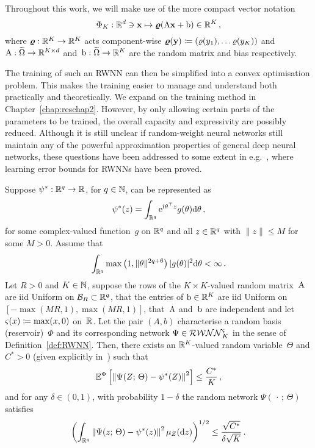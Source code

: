 \begin{remark}
Throughout this work, we will make use of the more compact vector notation
$$
\Phi_K: \mathbb{R}^d \ni \boldsymbol{\mathrm{x}}\mapsto \boldsymbol\varrho(\mathrm{A} \mathbf{x}+\mathrm{b}) \in \mathbb{R}^{K}\,,
$$
where $\boldsymbol\varrho:\mathbb{R}^K\rightarrow\mathbb{R}^K$ acts component-wise $\boldsymbol\varrho(\boldsymbol{\mathrm{y}})\coloneqq(\varrho(y_1), \dots \varrho(y_K))$ and~${\mathrm{A}: \widetilde{\Omega} \rightarrow \mathbb{R}^{K\times d}}$ and~${\mathrm{b}: \widetilde{\Omega} \rightarrow \mathbb{R}^K}$ are the random matrix and bias respectively.
\end{remark}

The training of such an RWNN can then be simplified into a convex optimisation problem. This makes the training easier to manage and understand both practically and theoretically. We expand on the training method in Chapter~\ref{chap:reschap2}. However, by only allowing certain parts of the parameters to be trained, the overall capacity and expressivity are possibly reduced. Although it is still unclear if random-weight neural networks still maintain any of the powerful approximation properties of general deep neural networks, these questions have been addressed to some extent in e.g.~\cite{Gonon2023ApproximationSystems, Mei2022GeneralizationConcentration}, where learning error bounds for RWNNs have been proved.

\begin{proposition}\label{prop:UATRWNN}
Suppose $\psi^{*}: \mathbb{R}^{q} \rightarrow \mathbb{R}$, for $q\in\mathbb{N}$, can be represented as
$$
\psi^{*}(z)=\int_{\mathbb{R}^{q}} \mathrm{e}^{{\mathrm{i}\mkern1mu}\theta^\top z} g(\theta) \mathrm{d} \theta\,,
$$
for some complex-valued function~$g$ on $\mathbb{R}^{q}$ and all $z \in \mathbb{R}^{q}$ with $\|z\| \leq M$ for some $M>0$. Assume that
$$
\int_{\mathbb{R}^{q}} \max \left(1,\|\theta \|^{2 q+6}\right)|g(\theta)|^{2} \mathrm{d} \theta <\infty\,.
$$
Let $R>0$ and $K\in\mathbb{N}$, suppose the rows of the $K\times K$-valued random matrix~$\mathrm{A}$ are iid Uniform on $\mathcal{B}_{R} \subset \mathbb{R}^{q}$, that the entries of $\mathrm{b}\in\mathbb{R}^{K}$ are iid Uniform on~$[-\max (M R, 1), \max (M R, 1)]$, 
that~$\mathrm{A}$ and~$\mathrm{b}$ are independent and let~${\varsigma(x)\coloneqq\max (x, 0)}$ on~$\mathbb{R}$. 
Let the pair $(A,b)$ characterise a random basis (reservoir)~$\Phi$ and its corresponding network $\Psi\in\mathcal{RWNN}^{\varsigma}_K$ in the sense of Definition~\ref{def:RWNN}. 
Then, there exists an $\mathbb{R}^K$-valued random variable~$\Theta$ and $C^{*}>0$ 
(given explicitly in~\cite[Equation~(33)]{Gonon2023ApproximationSystems}) such that
$$
\mathbb{E}^\Phi\left[\left\|\Psi(Z;\, \Theta)-\psi^{*}(Z)\right\|^{2}\right] \leq \frac{C^{*}}{K}\,,
$$
and for any $\delta \in(0,1)$, with probability $1-\delta$ the random network $\Psi(\,\cdot\,;\,\Theta)$ satisfies
$$
\left(\int_{\mathbb{R}^{q}}\left\|\Psi(z;\, \Theta)-\psi^{*}(z)\right\|^{2} \mu_{Z}(\mathrm{d} z)\right)^{1 / 2} \leq \frac{\sqrt{C^{*}}}{\delta \sqrt{K}}\,.
$$
\end{proposition}

